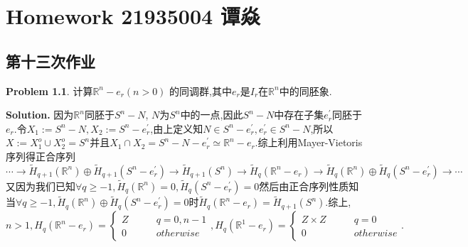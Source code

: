 \documentclass[a4paper]{book}
\makeatletter
\newenvironment{solution}%
{\noindent\textbf{Solution.}}%
{\qedhere}
\newcommand{\voidenvironment}[1]{%
  \expandafter\providecommand\csname env@#1@save@env\endcsname{}%
  \expandafter\providecommand\csname env@#1@process\endcsname{}%
  \@ifundefined{#1}{}{\RenewEnviron{#1}{}}%
}
\numberwithin{equation}{chapter}
\theoremstyle{definition}
\newtheorem{pro}[exm]{Problem}
\makeatother
\begin{document}
\pagestyle{empty}
% 



\setcounter{chapter}{6}




\chapter{Homework 21935004 谭焱}

\section{第十三次作业}

\begin{pro}
  计算$\mathbb{R}^n - e_r (n > 0)$ 的同调群,其中$e_r$是$I_r$在$\mathbb{R}^n$中的同胚象.
\end{pro}

\begin{solution}
  因为$\mathbb{R}^n$同胚于$S^n - N$, $N$为$S^n$中的一点,因此$S^n - N$中存在子集$ e_r^\prime $同胚于$e_r$.令$X_1 := S^n - N, X_2 := S^n - e_r^\prime$,由上定义知$N \in S^n - e_r^\prime, e_r^\prime \in S^n - N$,所以$X := X_1^o \cup X_2^o = S^n $并且$X_1 \cap X_2 = S^n - N - e_r^\prime \simeq \mathbb{R}^n - e_r$.综上利用Mayer-Vietoris序列得正合序列
  \[\cdots\rightarrow \widetilde{H}_{q+1}(\mathbb{R}^n) \oplus \widetilde{H}_{q+1}(S^n - e_r^\prime) \rightarrow \widetilde{H}_{q+1}(S^n) \rightarrow \widetilde{H}_q(\mathbb{R}^n - e_r) \rightarrow \widetilde{H}_q(\mathbb{R}^n) \oplus \widetilde{H}_q(S^n - e_r^\prime) \rightarrow \cdots \]
  又因为我们已知$\forall q \geq -1,\widetilde{H}_q(\mathbb{R}^n) = 0, \widetilde{H}_q(S^n - e_r^\prime) = 0$然后由正合序列性质知当$\forall q \geq -1,\widetilde{H}_q(\mathbb{R}^n) \oplus \widetilde{H}_q(S^n - e_r^\prime) = 0$时$\widetilde{H}_q(\mathbb{R}^n - e_r) = \widetilde{H}_{q+1}(S^n)$.综上,$n > 1,H_q(\mathbb{R}^n -e_r) =
  \begin{cases}
    Z \qquad &q = 0,n-1 \\
    0        &otherwise
  \end{cases}, H_q(\mathbb{R}^1 - e_r) =
  \begin{cases}
    Z \times Z \qquad &q = 0 \\
    0          &otherwise
  \end{cases}.
$
\end{solution}
\end{document}
